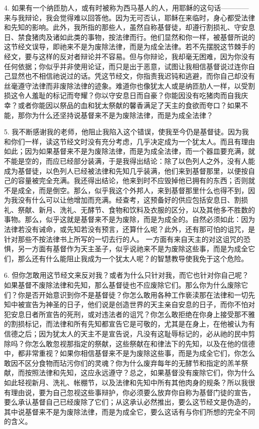 4. 如果有一个纳匝肋人，或有时被称为西马基人的人，用耶稣的这句话————来与我辩论，我会觉得难以回答他。因为无可否认，耶稣在来临时，身心都受法律和先知的影响。此外，我所指的那些人，虽然自称基督徒，却遵行割损礼、守安息日、禁食猪肉及诸如此类的事物，按法律而行。他们显然和你一样，被基督所说的这节经文误导，即祂来不是为废除法律，而是为成全法律。若不先摆脱这节棘手的经文，要与这样的反对者辩论并不容易。但与你辩论，我却毫无困难，因为你没有任何依据；你似乎并非使用论证，而只是出于恶意，试图让我相信基督说过连你自己显然也不相信祂说过的话。凭这节经文，你指责我迟钝和逃避，而你自己却没有丝毫遵守法律而非废除法律的迹象。难道你也像犹太人或是纳匝肋人一样，以受割损这令人羞耻的标记而夸耀？你以守安息日而自豪？你能因没有吃猪肉而自我庆幸？或者你能因以祭品的血和犹太祭献的馨香满足了天主的食欲而夸口？如果不能，那你为什么还坚持说基督来不是为废除法律，而是为成全法律？\par

5. 我不断感谢我的老师，他阻止我陷入这个错误，使我至今仍是基督徒。因为我和你们一样，读这节经文时没有充分考虑，几乎决定成为一个犹太人。而且有理由如此；因为如果基督来不是为废除法律，而是为成全法律，而一个器皿要充满，就不能是空的，而应已经部分装满，于是我得出结论：除了以色列人之外，没有人能成为基督徒，以色列人已经被法律和先知几乎装满，他们来到基督那里，以便按自己的容量被完全充满。我还得出结论，他来到时不应毁掉他已拥有的东西；否则就不是成全，而是倒空。那么，似乎我这个外邦人，来到基督那里什么也得不到，因为我没有什么可以让他增加而充满。经查考，这预备好的供应包括安息日、割损礼、祭献、新月、洗礼、无酵节、食物和饮料及衣服的区分，以及其他多不胜数的事物。那么，似乎这就是基督来不是为废除，而是为成全的。自然必须如此：因为法律若没有诫命，或先知若没有预言，还算什么呢？此外，还有那可怕的诅咒，是针对那些不按法律书上所写的一切去行的人。 一方面有来自天主的对这诅咒的恐惧，另一方面有基督作为天主圣子，似乎说祂来不是为废除这些事，而是为成全它们，那么还有什么能阻止我成为一个犹太人呢？的智慧教导使我免于这个危险。\par

6. 但你怎敢用这节经文来反对我？或者为什么只针对我，而它也针对你自己呢？如果基督不废除法律和先知，那么基督徒也不应废除它们。那么你为什么废除它们？你是否开始意识到你不是基督徒？你怎么敢用各种工作亵渎那在法律和一切先知中被宣告为神圣的日子，他们说是创造世界的天主亲自安息的日子，而你不怕对犯安息日者所宣告的死刑，或对违法者的诅咒？你怎么敢拒绝在你身上接受那不雅的割损标记，而法律和所有先知都宣告它是可敬的，尤其是在身上，在他被认为有信德之后；因为犹太人的天主不是宣告说，凡没有这耻辱标记的，必从祂的民中剪除吗？你怎么敢忽视那指定的祭献，这些祭献在和律法下的先知，以及在他的信德中，都非常重视？如果你相信基督来不是为废除这些事，而是为成全它们，你怎么敢因不区分食物而玷污你们的灵魂？你为什么废弃每年的无酵节和指定的羔羊祭献，而按照法律和先知，这应永远遵守？总之，如果基督没有废除它们，你为什么如此轻视新月、洗礼、帐棚节，以及法律和先知中所有其他肉身的规条？所以我很有理由说，要为自己忽视这些事辩护，你必须要么放弃你自称为基督门徒的宣告，要么承认基督自己已经废除了它们；从这承认必然推出，要么这节经文是伪造的，其中说基督来不是为废除法律，而是为成全它，要么这话有与你们所想的完全不同的含义。\par

